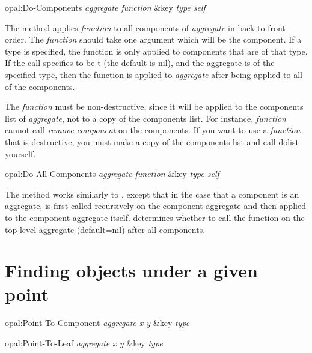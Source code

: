 \begin{programexample}
opal:Do-Components {\it aggregate function} \&key {\it type self}\value{method}
\end{programexample}

The  method applies {\it function} to all components of
{\it aggregate} in back-to-front order.  The {\it function} should take one
argument which will be the
component. If a type is specified, the function is only applied to
components that are of that type.  If the call specifies  to be {\sc t}
(the default is {\sc nil}), and the aggregate is of the specified type,
then the function is applied to {\it aggregate} after being applied to
all of the components.

The {\it function} must be non-destructive, since it will be applied to the
components list of {\it aggregate}, not to a copy of the components
list.  For instance, {\it function} cannot call {\it remove-component} on
the components.  If you want to use a {\it function} that is
destructive, you must make a copy of the components list and call
dolist yourself.

\vspace{1 line}
\begin{programexample}
opal:Do-All-Components {\it aggregate function} \&key {\it type self}\value{method}
\end{programexample}

The  method works similarly to ,
except that in the case that a component is an aggregate,
 is first called recursively on the component
aggregate and then applied to the component aggregate itself.
 determines whether to call the function on the top level
aggregate (default={\sc nil}) after all components.

\section{Finding objects under a given point}
\label{querying-children}

\vspace{1 line}
\begin{programexample}
opal:Point-To-Component {\it aggregate x y} \&key {\it type}\value{method}

opal:Point-To-Leaf {\it aggregate x y} \&key {\it type}\value{method}
\end{programexample}


